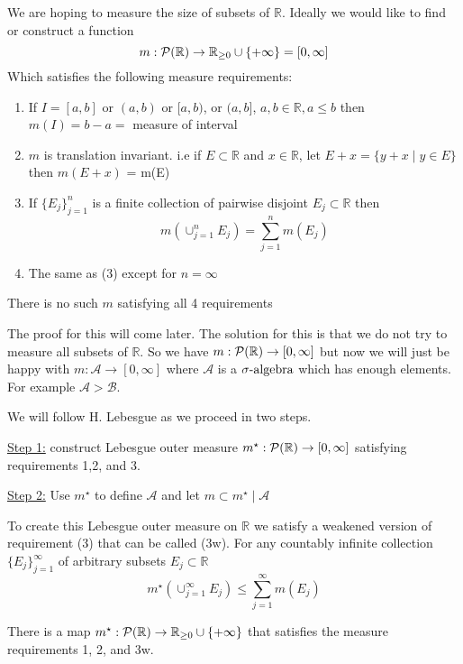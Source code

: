 We are hoping to measure the size of subsets of $\mathbb{R}$.
Ideally we would like to find or construct a function
\[
    m: \mathcal{P}(\mathbb{R}) \rightarrow \mathbb{R}_{\geq 0} \cup \{ + \infty \} = [0, \infty]
\]
Which satisfies the following measure requirements:
\begin{enumerate}
    \item If $I=[a,b]$ or $(a,b)$ or $[a,b)$, or $(a,b]$, $a,b \in \mathbb{R}, a \leq b$ then $m(I) = b-a = $ measure of interval
    \item $m$ is translation invariant.
    i.e if $E \subset \mathbb{R}$ and $x \in \mathbb{R}$, let $E + x = \{ y+x \mid y \in E \}$ then $m(E+x)$ = m(E)
    \item If $\{ E_j \}_{j=1}^{n}$ is a finite collection of pairwise disjoint $E_j \subset \mathbb{R}$ then
    \[
        m \left( \cup_{j=1}^{n} E_j \right) = \sum_{j=1}^{n} m(E_j)
    \]
    \item The same as (3) except for $n = \infty$
\end{enumerate}

\begin{theorem}
    There is no such $m$ satisfying all 4 requirements
\end{theorem}

The proof for this will come later.
The solution for this is that we do not try to measure all subsets of $\mathbb{R}$.
So we have $m: \mathcal{P}(\mathbb{R}) \rightarrow [0, \infty]$ but now we will just be happy with $m: \mathcal{A} \rightarrow [0,\infty]$ where $\mathcal{A}$ is a $\sigma\text{-algebra}$ which has enough elements.
For example $\mathcal{A} > \mathcal{B}$.

We will follow H. Lebesgue as we proceed in two steps.

\underline{Step 1:} construct Lebesgue outer measure $m^{\star}: \mathcal{P}(\mathbb{R}) \rightarrow [0, \infty]$ satisfying requirements 1,2, and 3.

\underline{Step 2:} Use $m^{\star}$ to define $\mathcal{A}$ and let $m \subset m^{\star} \mid \mathcal{A}$

To create this Lebesgue outer measure on $\mathbb{R}$ we satisfy a weakened version of requirement (3) that can be called (3w).
For any countably infinite collection $\{ E_j \}_{j=1}^{\infty}$ of arbitrary subsets $E_j \subset \mathbb{R}$
\[
    m^{\star}(\cup_{j=1}^{\infty} E_j) \leq \sum_{j=1}^{\infty} m(E_j)
\]
\begin{theorem}
    There is a map $m^{\star}: \mathcal{P}(\mathbb{R}) \rightarrow \mathbb{R}_{\geq 0} \cup \{ + \infty \} $ that satisfies the measure requirements 1, 2, and 3w.
\end{theorem}

